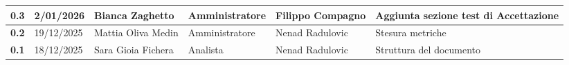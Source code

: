 \documentclass[a4paper,12pt]{article}
\begin{document}
{\begin{table}[h!]
\begin{tabularx}{\textwidth}{|l|l|l|l|L|L|}
                \hline
                \textbf{0.3} & 2/01/2026 & Bianca Zaghetto & Amministratore & Filippo Compagno & Aggiunta sezione test di Accettazione \\
                \hline
                \textbf{0.2} & 19/12/2025 & Mattia Oliva Medin & Amministratore & Nenad Radulovic & Stesura metriche\\
                \hline
                \textbf{0.1} & 18/12/2025 & Sara Gioia Fichera & Analista & Nenad Radulovic & Struttura del documento \\
                \hline
            \end{tabularx}
        \end{table}
    }
    \newpage
    
    \tableofcontents
    \newpage

    \listoffigures
    \newpage

    \listoftables
    \newpage
    
\end{document}
